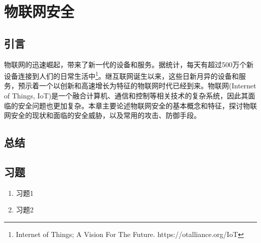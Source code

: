 \specialsectioning
\chapter{物联网安全}
\label{chap:intro}

\section{引言}
\renewcommand\specialsectioning{\setcounter{secnumdepth}{2}} 
\specialsectioning
\renewcommand\sectionmark[1]{\markright{\thesection  #1}{}}

物联网的迅速崛起，带来了新一代的设备和服务。据统计，每天有超过500万个新设备连接到人们的日常生活中\footnote{Internet of Things; A Vision For The Future. https://otalliance.org/IoT}。继互联网诞生以来，这些日新月异的设备和服务，预示着一个以创新和高速增长为特征的物联网时代已经到来。物联网(Internet of Things, IoT)是一个融合计算机、通信和控制等相关技术的复杂系统，因此其面临的安全问题也更加复杂。本章主要论述物联网安全的基本概念和特征，探讨物联网安全的现状和面临的安全威胁，以及常用的攻击、防御手段。







\section{总结}
\label{xj_ch2}
\section{习题}

\begin{enumerate}
	\item {习题1}
	\item {习题2}
	
\end{enumerate}


